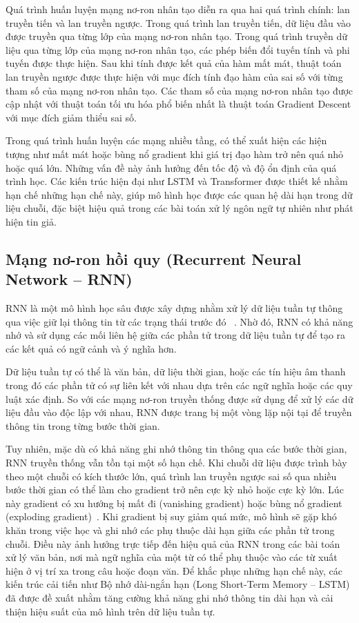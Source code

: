 \documentclass[12pt, a4paper]{report}
\begin{document}
Quá trình huấn luyện mạng nơ-ron nhân tạo diễn ra qua hai quá trình chính: lan truyền tiến và lan truyền ngược. Trong quá trình lan truyền tiến, dữ liệu đầu vào được truyền qua từng lớp của mạng nơ-ron nhân tạo. Trong quá trình truyền dữ liệu qua từng lớp của mạng nơ-ron nhân tạo, các phép biến đổi tuyến tính và phi tuyến được thực hiện. Sau khi tính được kết quả của hàm mất mát, thuật toán lan truyền ngược được thực hiện với mục đích tính đạo hàm của sai số với từng tham số của mạng nơ-ron nhân tạo. Các tham số của mạng nơ-ron nhân tạo được cập nhật với thuật toán tối ưu hóa phổ biến nhất là thuật toán Gradient Descent với mục đích giảm thiểu sai số.

Trong quá trình huấn luyện các mạng nhiều tầng, có thể xuất hiện các hiện tượng như mất mát hoặc bùng nổ gradient khi giá trị đạo hàm trở nên quá nhỏ hoặc quá lớn. Những vấn đề này ảnh hưởng đến tốc độ và độ ổn định của quá trình học. Các kiến trúc hiện đại như LSTM và Transformer được thiết kế nhằm hạn chế những hạn chế này, giúp mô hình học được các quan hệ dài hạn trong dữ liệu chuỗi, đặc biệt hiệu quả trong các bài toán xử lý ngôn ngữ tự nhiên như phát hiện tin giả.

\subsection{Mạng nơ-ron hồi quy (Recurrent Neural Network -- RNN)}

RNN là một mô hình học sâu được xây dựng nhằm xử lý dữ liệu tuần tự thông qua việc giữ lại thông tin từ các trạng thái trước đó ~\cite{elman1990rnn}. Nhờ đó, RNN có khả năng nhớ và sử dụng các mối liên hệ giữa các phần tử trong dữ liệu tuần tự để tạo ra các kết quả có ngữ cảnh và ý nghĩa hơn. 

Dữ liệu tuần tự có thể là văn bản, dữ liệu thời gian, hoặc các tín hiệu âm thanh trong đó các phần tử có sự liên kết với nhau dựa trên các ngữ nghĩa hoặc các quy luật xác định. So với các mạng nơ-ron truyền thống được sử dụng để xử lý các dữ liệu đầu vào độc lập với nhau, RNN được trang bị một vòng lặp nội tại để truyền thông tin trong từng bước thời gian.

Tuy nhiên, mặc dù có khả năng ghi nhớ thông tin thông qua các bước thời gian, RNN truyền thống vẫn tồn tại một số hạn chế. Khi chuỗi dữ liệu được trình bày theo một chuỗi có kích thước lớn, quá trình lan truyền ngược sai số qua nhiều bước thời gian có thể làm cho gradient trở nên cực kỳ nhỏ hoặc cực kỳ lớn. Lúc này gradient có xu hướng bị mất đi (vanishing gradient) hoặc bùng nổ gradient (exploding gradient)~\cite{bengio1994vanishing,pascanu2013gradient}. Khi gradient bị suy giảm quá mức, mô hình sẽ gặp khó khăn trong việc học và ghi nhớ các phụ thuộc dài hạn giữa các phần tử trong chuỗi. Điều này ảnh hưởng trực tiếp đến hiệu quả của RNN trong các bài toán xử lý văn bản, nơi mà ngữ nghĩa của một từ có thể phụ thuộc vào các từ xuất hiện ở vị trí xa trong câu hoặc đoạn văn. Để khắc phục những hạn chế này, các kiến trúc cải tiến như Bộ nhớ dài-ngắn hạn (Long Short-Term Memory -- LSTM) đã được đề xuất nhằm tăng cường khả năng ghi nhớ thông tin dài hạn và cải thiện hiệu suất của mô hình trên dữ liệu tuần tự.
\end{document}

